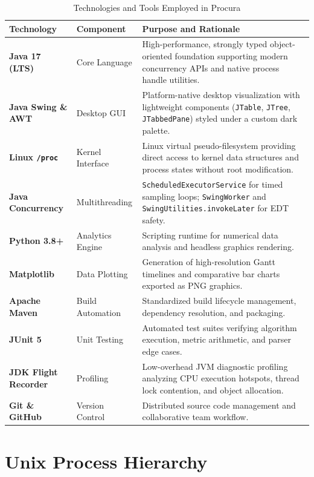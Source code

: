 \documentclass[12pt,a4paper]{article}
\begin{document}
\begin{table}[H]
\centering
\caption{Technologies and Tools Employed in Procura}
\label{tab:technologies}
\begin{tabular}{@{}llp{8.5cm}@{}}
\toprule
\textbf{Technology} & \textbf{Component} & \textbf{Purpose and Rationale} \\ \midrule
\textbf{Java 17 (LTS)} & Core Language & High-performance, strongly typed object-oriented foundation supporting modern concurrency APIs and native process handle utilities. \\
\textbf{Java Swing \& AWT} & Desktop GUI & Platform-native desktop visualization with lightweight components (\texttt{JTable}, \texttt{JTree}, \texttt{JTabbedPane}) styled under a custom dark palette. \\
\textbf{Linux \texttt{/proc}} & Kernel Interface & Linux virtual pseudo-filesystem providing direct access to kernel data structures and process states without root modification. \\
\textbf{Java Concurrency} & Multithreading & \texttt{ScheduledExecutorService} for timed sampling loops; \texttt{SwingWorker} and \texttt{SwingUtilities.invokeLater} for EDT safety. \\
\textbf{Python 3.8+} & Analytics Engine & Scripting runtime for numerical data analysis and headless graphics rendering. \\
\textbf{Matplotlib} & Data Plotting & Generation of high-resolution Gantt timelines and comparative bar charts exported as PNG graphics. \\
\textbf{Apache Maven} & Build Automation & Standardized build lifecycle management, dependency resolution, and packaging. \\
\textbf{JUnit 5} & Unit Testing & Automated test suites verifying algorithm execution, metric arithmetic, and parser edge cases. \\
\textbf{JDK Flight Recorder} & Profiling & Low-overhead JVM diagnostic profiling analyzing CPU execution hotspots, thread lock contention, and object allocation. \\
\textbf{Git \& GitHub} & Version Control & Distributed source code management and collaborative team workflow. \\ \bottomrule
\end{tabular}
\end{table}

\section{Unix Process Hierarchy}
\end{document}
